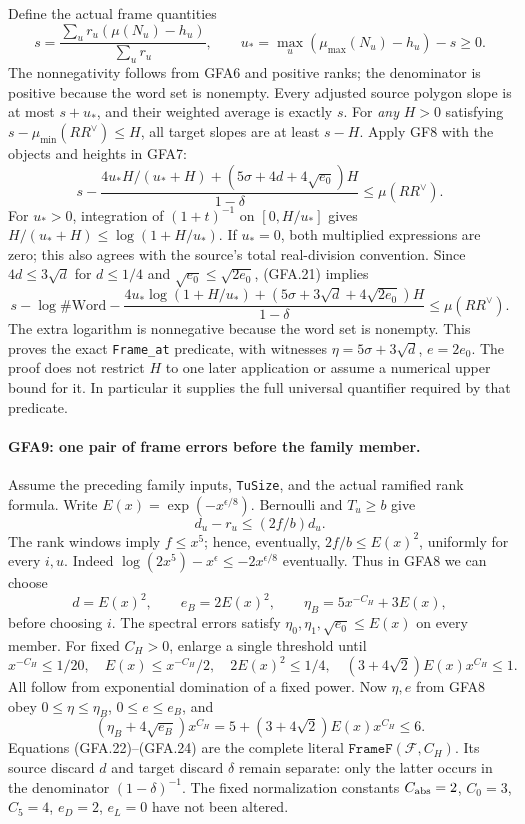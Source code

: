 Define the actual frame quantities
\[
 s=\frac{\sum_ur_u(\mu(N_u)-h_u)}{\sum_ur_u},\qquad
 u_* =\max_u(\mu_{\max}(N_u)-h_u)-s\ge0.                    \tag{GFA.20}
\]
The nonnegativity follows from GFA6 and positive ranks; the
denominator is positive because the word set is nonempty.
Every adjusted source polygon slope is at most $s+u_*$, and
their weighted average is exactly $s$.
For \emph{any} $H>0$ satisfying
$s-\mu_{\min}(RR^\vee)\le H$, all target slopes are at least
$s-H$.  Apply GF8 with the objects and heights in GFA7:
\[
 s-\frac{4u_*H/(u_*+H)+(5\sigma+4d+4\sqrt{e_0})H}{1-\delta}
       \le\mu(RR^\vee).                                    \tag{GFA.21}
\]
For $u_*>0$, integration of $(1+t)^{-1}$ on $[0,H/u_*]$
gives
$H/(u_*+H)\le\log(1+H/u_*)$.
If $u_*=0$, both multiplied expressions are zero; this also
agrees with the source's total real-division convention.
Since $4d\le3\sqrt d$ for $d\le1/4$ and
$\sqrt{e_0}\le\sqrt{2e_0}$, (GFA.21) implies
\[
 s-\log\#\mathrm{Word}
 -\frac{4u_*\log(1+H/u_*)+
        (5\sigma+3\sqrt d+4\sqrt{2e_0})H}{1-\delta}
 \le\mu(RR^\vee).                                         \tag{GFA.22}
\]
The extra logarithm is nonnegative because the word set is
nonempty.  This proves the exact \texttt{Frame\_at} predicate,
with witnesses $\eta=5\sigma+3\sqrt d$, $e=2e_0$.
The proof does not restrict $H$ to one later application or
assume a numerical upper bound for it.  In particular it supplies
the full universal quantifier required by that predicate.

\paragraph{GFA9: one pair of frame errors before the family member.}
\label{claim:GFA9}
Assume the preceding family inputs, \texttt{TuSize}, and the
actual ramified rank formula.  Write
$E(x)=\exp(-x^{\epsilon/8})$.
Bernoulli and $T_u\ge b$ give
\[
 d_u-r_u\le(2f/b)d_u.
\]
The rank windows imply $f\le x^5$; hence, eventually,
$2f/b\le E(x)^2$, uniformly for every $i,u$.
Indeed
$\log(2x^5)-x^\epsilon\le-2x^{\epsilon/8}$ eventually.
Thus in GFA8 we can choose
\[
 d=E(x)^2,\qquad e_B=2E(x)^2,\qquad
 \eta_B=5x^{-C_H}+3E(x),                                  \tag{GFA.23}
\]
before choosing $i$.  The spectral errors satisfy
$\eta_0,\eta_1,\sqrt{e_0}\le E(x)$ on every member.
For fixed $C_H>0$, enlarge a single threshold until
\[
 x^{-C_H}\le1/20,\quad E(x)\le x^{-C_H}/2,
 \quad 2E(x)^2\le1/4,
 \quad (3+4\sqrt2)E(x)x^{C_H}\le1.
\]
All follow from exponential domination of a fixed power.
Now $\eta,e$ from GFA8 obey
$0\le\eta\le\eta_B$, $0\le e\le e_B$, and
\[
 (\eta_B+4\sqrt{e_B})x^{C_H}
 =5+(3+4\sqrt2)E(x)x^{C_H}\le6.                            \tag{GFA.24}
\]
Equations (GFA.22)--(GFA.24) are the complete literal
$\texttt{FrameF}(\mathcal F,C_H)$.
Its source discard $d$ and target discard $\delta$ remain
separate: only the latter occurs in the denominator
$(1-\delta)^{-1}$.  The fixed normalization constants
$C_{\rm abs}=2$, $C_0=3$, $C_5=4$, $e_D=2$, $e_L=0$
have not been altered.

